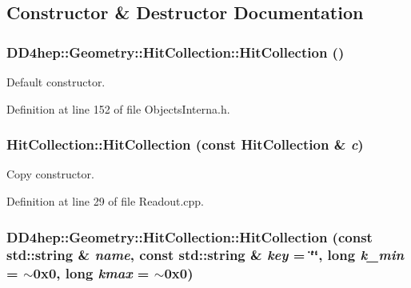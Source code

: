 \subsection{Constructor \& Destructor Documentation}
\hypertarget{class_d_d4hep_1_1_geometry_1_1_hit_collection_aede87fea1d9371d8d8459645dea6a663}{
\subsubsection[{HitCollection}]{\setlength{\rightskip}{0pt plus 5cm}DD4hep::Geometry::HitCollection::HitCollection ()}}
\label{class_d_d4hep_1_1_geometry_1_1_hit_collection_aede87fea1d9371d8d8459645dea6a663}


Default constructor. 

Definition at line 152 of file ObjectsInterna.h.\hypertarget{class_d_d4hep_1_1_geometry_1_1_hit_collection_a4caf6de6f5c18ee344c1d380fecd66ba}{
\subsubsection[{HitCollection}]{\setlength{\rightskip}{0pt plus 5cm}HitCollection::HitCollection (const {\bf HitCollection} \& {\em c})}}
\label{class_d_d4hep_1_1_geometry_1_1_hit_collection_a4caf6de6f5c18ee344c1d380fecd66ba}


Copy constructor. 

Definition at line 29 of file Readout.cpp.\hypertarget{class_d_d4hep_1_1_geometry_1_1_hit_collection_a94ca1d5d60e6c588bd20a0da61a1d969}{
\subsubsection[{HitCollection}]{\setlength{\rightskip}{0pt plus 5cm}DD4hep::Geometry::HitCollection::HitCollection (const std::string \& {\em name}, \/  const std::string \& {\em key} = {\ttfamily \char`\"{}\char`\"{}}, \/  long {\em k\_\-min} = {\ttfamily $\sim$0x0}, \/  long {\em kmax} = {\ttfamily $\sim$0x0})}}
\label{class_d_d4hep_1_1_geometry_1_1_hit_collection_a94ca1d5d60e6c588bd20a0da61a1d969}


